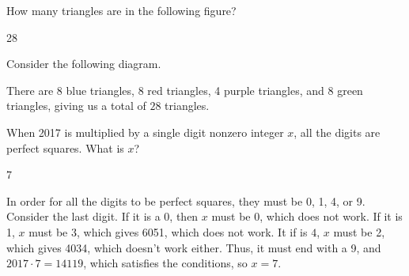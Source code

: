 \documentclass[11pt]{article}
\begin{document}
\begin{problem}
How many triangles are in the following figure?
    
    \begin{center}
    \end{center}
    
\end{problem}

\begin{answer}
28
\end{answer}

\begin{solution}
Consider the following diagram.
\begin{center}
    \end{center}
There are 8 blue triangles, 8 red triangles, 4 purple triangles, and 8 green triangles, giving us a total of $\boxed{28}$ triangles.

\end{solution}

\begin{problem}
When 2017 is multiplied by a single digit nonzero integer $x$, all the digits are perfect squares. What is $x$?
\end{problem}

\begin{answer}
7
\end{answer}

\begin{solution}
In order for all the digits to be perfect squares, they must be 0, 1, 4, or 9. Consider the last digit. If it is a 0, then $x$ must be 0, which does not work. If it is 1, $x$ must be 3, which gives 6051, which does not work. It if is $4$, $x$ must be 2, which gives 4034, which doesn't work either. Thus, it must end with a 9, and $2017\cdot7=14119$, which satisfies the conditions, so $x=\boxed{7}$.
\end{solution}
\end{document}
